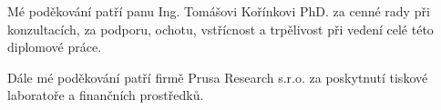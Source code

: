 % 
% 
%
Mé poděkování patří panu Ing. Tomášovi Kořínkovi PhD. za cenné rady při konzultacích, za podporu, ochotu, vstřícnost a trpělivost při vedení celé této diplomové práce.

Dále mé poděkování patří firmě Prusa Research s.r.o. za poskytnutí tiskové laboratoře a finančních prostředků.